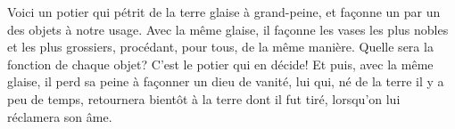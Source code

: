 Voici un potier qui pétrit de la terre glaise à grand-peine,
	et façonne un par un des objets à notre usage.
Avec la même glaise, il façonne les vases les plus nobles et les plus grossiers,
	procédant, pour tous, de la même manière.
Quelle sera la fonction de chaque objet?
	C’est le potier qui en décide!
Et puis, avec la même glaise, il perd sa peine à façonner un dieu de vanité,
	lui qui, né de la terre il y a peu de temps,
	retournera bientôt à la terre dont il fut tiré, lorsqu’on lui réclamera son âme.
